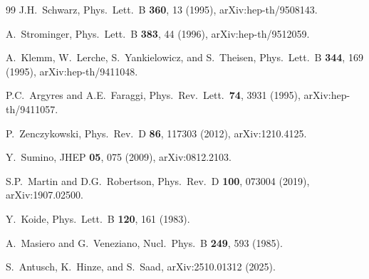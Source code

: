 \documentclass[aps,prd,twocolumn,showpacs,preprintnumbers,superscriptaddress,floatfix]{revtex4-2}
\begin{document}
\begin{thebibliography}{99}
  J.H.~Schwarz,
  Phys.\ Lett.\ B \textbf{360}, 13 (1995),
  arXiv:hep-th/9508143.

  A.~Strominger,
  Phys.\ Lett.\ B \textbf{383}, 44 (1996),
  arXiv:hep-th/9512059.

  A.~Klemm, W.~Lerche, S.~Yankielowicz, and S.~Theisen,
  Phys.\ Lett.\ B \textbf{344}, 169 (1995),
  arXiv:hep-th/9411048.

  P.C.~Argyres and A.E.~Faraggi,
  Phys.\ Rev.\ Lett.\ \textbf{74}, 3931 (1995),
  arXiv:hep-th/9411057.

  P.~Zenczykowski,
  Phys.\ Rev.\ D \textbf{86}, 117303 (2012),
  arXiv:1210.4125.

  Y.~Sumino,
  JHEP \textbf{05}, 075 (2009),
  arXiv:0812.2103.

  S.P.~Martin and D.G.~Robertson,
  Phys.\ Rev.\ D \textbf{100}, 073004 (2019),
  arXiv:1907.02500.

  Y.~Koide,
  Phys.\ Lett.\ B \textbf{120}, 161 (1983).

  A.~Masiero and G.~Veneziano,
  Nucl.\ Phys.\ B \textbf{249}, 593 (1985).

  S.~Antusch, K.~Hinze, and S.~Saad,
  arXiv:2510.01312 (2025).

\end{thebibliography}
\end{document}
